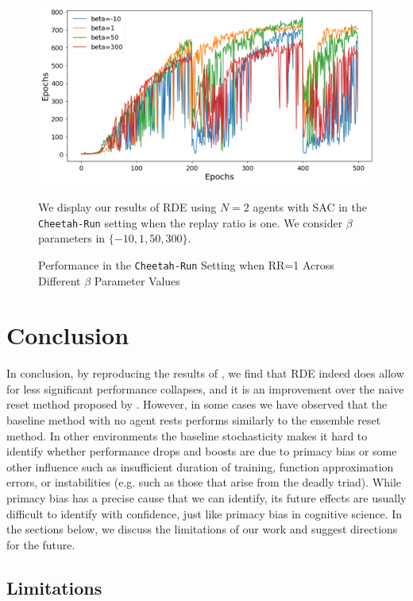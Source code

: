 \documentclass[base]{subfiles}
\begin{document}
\begin{figure}[h!]
	\centering
	\caption{Performance in the \texttt{Cheetah-Run} Setting when RR=1 Across Different $\beta$ Parameter Values}
	\label{fig:beta_test}
	\includegraphics[width = 1 \linewidth]{beta_test.png}
	\begin{flushleft} We display our results of RDE using $N=2$ agents with SAC in the \texttt{Cheetah-Run} setting when the replay ratio is one. We consider $\beta$ parameters in $\{ -10, 1, 50, 300 \}$.  \end{flushleft}
\end{figure}

\section{Conclusion}
\label{sec:conclusion}

In conclusion, by reproducing the results of \cite{kim2023}, we find that RDE indeed does allow for less significant performance collapses, and it is an improvement over the naive reset method proposed by \cite{nikishin2022}.
However, in some cases we have observed that the baseline method with no agent rests performs similarly to the ensemble reset method.
In other environments the baseline stochasticity makes it hard to identify whether performance drops and boosts are due to primacy bias or some other influence such as insufficient duration of training, function approximation errors, or instabilities (e.g. such as those that arise from the deadly triad).
While primacy bias has a precise cause that we can identify, its future effects are usually difficult to identify with confidence, just like primacy bias in cognitive science.
In the sections below, we discuss the limitations of our work and suggest directions for the future.

\subsection{Limitations}
\label{ssec:limits}
\end{document}
